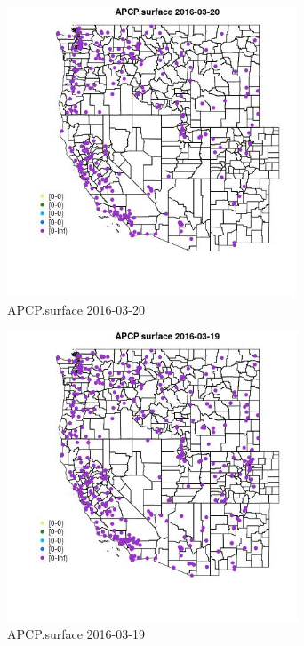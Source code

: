 \begin{figure} 
\centering  
\includegraphics[width=0.77\textwidth]{Code_Outputs/Report_ML_input_PM25_Step4_part_e_de_duplicated_aveswNAs_MapObsAPCPsurface2016-03-20.jpg} 
\caption{\label{fig:Report_ML_input_PM25_Step4_part_e_de_duplicated_aveswNAsMapObsAPCPsurface2016-03-20}APCP.surface 2016-03-20} 
\end{figure} 
 

\begin{figure} 
\centering  
\includegraphics[width=0.77\textwidth]{Code_Outputs/Report_ML_input_PM25_Step4_part_e_de_duplicated_aveswNAs_MapObsAPCPsurface2016-03-19.jpg} 
\caption{\label{fig:Report_ML_input_PM25_Step4_part_e_de_duplicated_aveswNAsMapObsAPCPsurface2016-03-19}APCP.surface 2016-03-19} 
\end{figure} 
 


